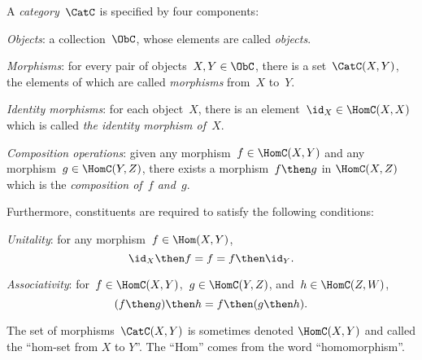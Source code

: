 \begin{shaded*}
\begin{definition}[Category] \label{def:categorymain}
A \emph{category}~$\CatC$ is specified by four components:
\begin{compactenum}
\item \emph{Objects}: a collection\footnotemark~$\ObC$, whose elements are called \emph{objects}.
\item \emph{Morphisms}: for every pair of objects~$X,Y\in \ObC$, there is a set~$\CatC(X,Y)$, the elements of which are called
\emph{morphisms} from~$X$ to~$Y$.
\item \emph{Identity morphisms}: for each object~$X$, there is
an element~$\id_X \in \HomC(X,X) $ which is called \emph{the identity
morphism of~$X$}.
\item \emph{Composition operations}: given any morphism~$f \in  \HomC(X,Y)$ and any morphism~$g \in \HomC(Y, Z)$, there exists a morphism~$f\then g$ in $\HomC(X,Z)$ which is the \emph{composition of~$f$ and~$g$}.
\end{compactenum}

Furthermore, constituents are required to satisfy the following conditions:
\begin{compactenum}
    \item \emph{Unitality}: for any morphism~$f\in\Hom(X,Y)$,
    \begin{equation}
        \id_X \then f= f = f \then \id_Y.
    \end{equation}
    \item \emph{Associativity}: for~$f\in \HomC(X,Y)$,~$g\in \HomC(Y,Z)$, and~$h\in \HomC(Z,W)$,
    \begin{equation}
        (f\then g)\then h= f \then (g \then h).
    \end{equation}
\end{compactenum}

\end{definition}
\end{shaded*}

\begin{remark}
The set of morphisms~$\CatC(X,Y)$ is sometimes denoted $\HomC(X,Y)$ and called the ``hom-set from $X$ to $Y$''. The ``Hom'' comes from the word ``homomorphism''.
\end{remark}

